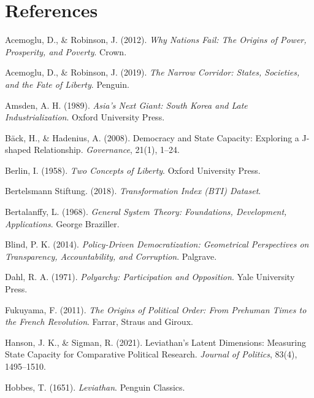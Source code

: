 \documentclass[12pt]{article}
\begin{document}
\section*{References}
\begin{description}

    \item Acemoglu, D., \& Robinson, J. (2012). \textit{Why Nations Fail: The Origins of Power, Prosperity, and Poverty}. Crown.

    \item Acemoglu, D., \& Robinson, J. (2019). \textit{The Narrow Corridor: States, Societies, and the Fate of Liberty}. Penguin.

    \item Amsden, A. H. (1989). \textit{Asia's Next Giant: South Korea and Late Industrialization}. Oxford University Press.

    \item Bäck, H., \& Hadenius, A. (2008). Democracy and State Capacity: Exploring a J-shaped Relationship. \textit{Governance}, 21(1), 1–24.

    \item Berlin, I. (1958). \textit{Two Concepts of Liberty}. Oxford University Press.

    \item Bertelsmann Stiftung. (2018). \textit{Transformation Index (BTI) Dataset}.

    \item Bertalanffy, L. (1968). \textit{General System Theory: Foundations, Development, Applications}. George Braziller.

    \item Blind, P. K. (2014). \textit{Policy-Driven Democratization: Geometrical Perspectives on Transparency, Accountability, and Corruption}. Palgrave.

    \item Dahl, R. A. (1971). \textit{Polyarchy: Participation and Opposition}. Yale University Press.

    \item Fukuyama, F. (2011). \textit{The Origins of Political Order: From Prehuman Times to the French Revolution}. Farrar, Straus and Giroux.

    \item Hanson, J. K., \& Sigman, R. (2021). Leviathan's Latent Dimensions: Measuring State Capacity for Comparative Political Research. \textit{Journal of Politics}, 83(4), 1495–1510.

    \item Hobbes, T. (1651). \textit{Leviathan}. Penguin Classics.


\end{description}
\end{document}
